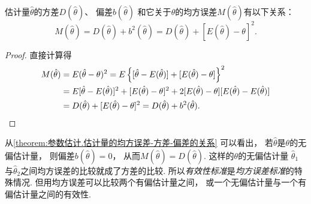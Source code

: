 \begin{theorem}\label{theorem:参数估计.估计量的均方误差-方差-偏差的关系}
估计量\(\hat{\theta}\)的方差\(D(\hat{\theta})\)、
偏差\(b(\hat{\theta})\)
和它关于\(\theta\)的均方误差\(M(\hat{\theta})\)有以下关系：
\begin{equation}
	M(\hat{\theta}) = D(\hat{\theta}) + b^2(\hat{\theta})
	= D(\hat{\theta}) + [E(\hat{\theta}) - \theta]^2.
\end{equation}
\begin{proof}
直接计算得\begin{align*}
	M(\hat{\theta})
	&= E(\hat{\theta} - \theta)^2
	= E\left\{
		[\hat{\theta} - E(\hat{\theta})]
		+ [E(\hat{\theta}) - \theta]
	\right\}^2 \\
	&= E[\hat{\theta} - E(\hat{\theta})]^2
	+ [E(\hat{\theta}) - \theta]^2
	+ 2[E(\hat{\theta}) - \theta][E(\hat{\theta}) - E(\hat{\theta})] \\
	&= D(\hat{\theta}) + [E(\hat{\theta}) - \theta]^2
	= D(\hat{\theta}) + b^2(\hat{\theta}).
	\qedhere
\end{align*}
\end{proof}
\end{theorem}
从\cref{theorem:参数估计.估计量的均方误差-方差-偏差的关系} 可以看出，
若\(\hat{\theta}\)是\(\theta\)的无偏估计量，
则偏差\(b(\hat{\theta})=0\)，
从而\(M(\hat{\theta})=D(\hat{\theta})\).
这样的\(\theta\)的无偏估计量
\(\hat{\theta}_1\)与\(\hat{\theta}_2\)之间均方误差的比较就成了方差的比较.
所以\emph{有效性标准}是\emph{均方误差标准}的特殊情况.
但用均方误差可以比较两个有偏估计量之间，
或一个无偏估计量与一个有偏估计量之间的有效性.

